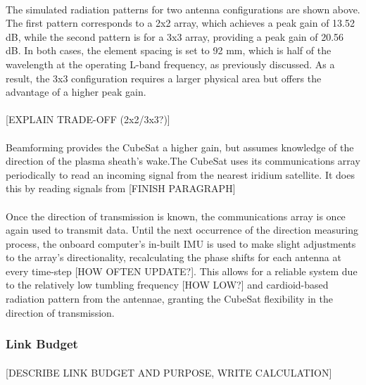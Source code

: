 \documentclass[11pt]{article}
\begin{document}
	\paragraph{} The simulated radiation patterns for two antenna configurations are shown above. The first pattern corresponds to a 2x2 array, which achieves a peak gain of 13.52 dB, while the second pattern is for a 3x3 array, providing a peak gain of 20.56 dB. In both cases, the element spacing is set to 92 mm, which is half of the wavelength at the operating L-band frequency, as previously discussed. As a result, the 3x3 configuration requires a larger physical area but offers the advantage of a higher peak gain.
	
	\paragraph{}[EXPLAIN TRADE-OFF (2x2/3x3?)]
	
	\paragraph{}Beamforming provides the CubeSat a higher gain, but assumes knowledge of the direction of the plasma sheath's wake.The CubeSat uses its communications array periodically to read an incoming signal from the nearest iridium satellite. It does this by reading signals from [FINISH PARAGRAPH]
	
	\paragraph{}Once the direction of transmission is known, the communications array is once again used to transmit data. Until the next occurrence of the direction measuring process, the onboard computer's in-built IMU is used to make slight adjustments to the array's directionality, recalculating the phase shifts for each antenna at every time-step [HOW OFTEN UPDATE?]. This allows for a reliable system due to the relatively low tumbling frequency [HOW LOW?] and cardioid-based radiation pattern from the antennae, granting the CubeSat flexibility in the direction of transmission.
	
	
	\subsubsection{Link Budget}
	
	\paragraph{}[DESCRIBE LINK BUDGET AND PURPOSE, WRITE CALCULATION]
	
\end{document}
